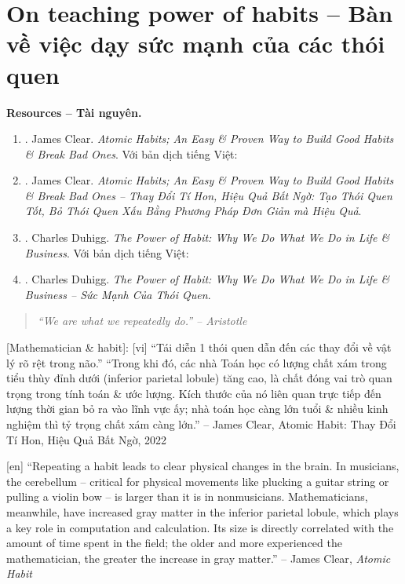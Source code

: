 \documentclass[12pt,twoside]{book}
\begin{document}
\section{On teaching power of habits -- Bàn về việc dạy sức mạnh của các thói quen}
{\bf \textsf{Resources -- Tài nguyên.}}
\begin{enumerate}
	\item \cite{Clear_habit}. {\sc James Clear}. {\it Atomic Habits; An Easy \& Proven Way to Build Good Habits \& Break Bad Ones}. Với bản dịch tiếng Việt:
	\item \cite{Clear_habit_VN}. {\sc James Clear}. {\it Atomic Habits; An Easy \& Proven Way to Build Good Habits \& Break Bad Ones -- Thay Đổi Tí Hon, Hiệu Quả Bất Ngờ: Tạo Thói Quen Tốt, Bỏ Thói Quen Xấu Bằng Phương Pháp Đơn Giản mà Hiệu Quả}.
	\item \cite{Duhigg_habit}. {\sc Charles Duhigg}. {\it The Power of Habit: Why We Do What We Do in Life \& Business}. Với bản dịch tiếng Việt:
	\item \cite{Duhigg_habit_VN}. {\sc Charles Duhigg}. {\it The Power of Habit: Why We Do What We Do in Life \& Business -- Sức Mạnh Của Thói Quen}.
\end{enumerate}

\begin{quote}\it
	``We are what we repeatedly do.'' -- {\sc Aristotle}
\end{quote}
[Mathematician \& habit]: [vi] ``Tái diễn 1 thói quen dẫn đến các thay đổi về vật lý rõ rệt trong não.'' ``Trong khi đó, các nhà Toán học có lượng chất xám trong tiểu thùy đỉnh dưới (inferior parietal lobule) tăng cao, là chất đóng vai trò quan trọng trong tính toán \& ước lượng. Kích thước của nó liên quan trực tiếp đến lượng thời gian bỏ ra vào lĩnh vực ấy; nhà toán học càng lớn tuổi \& nhiều kinh nghiệm thì tỷ trọng chất xám càng lớn.'' -- James Clear, Atomic Habit: Thay Đổi Tí Hon, Hiệu Quả Bất Ngờ, 2022

[en] ``Repeating a habit leads to clear physical changes in the brain. In musicians, the cerebellum -- critical for physical movements like plucking a guitar string or pulling a violin bow -- is larger than it is in nonmusicians. Mathematicians, meanwhile, have increased gray matter in the inferior parietal lobule, which plays a key role in computation and calculation. Its size is directly correlated with the amount of time spent in the field; the older and more experienced the mathematician, the greater the increase in gray matter.'' -- {\sc James Clear}, {\it Atomic Habit} \cite{Clear_habit,Clear_habit_VN}
\end{document}
